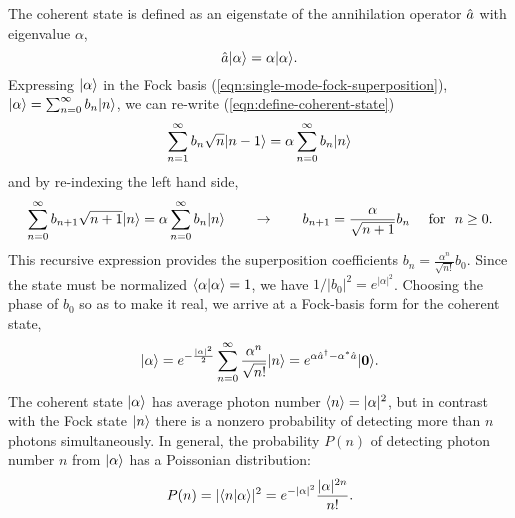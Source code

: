 The coherent state is defined as an eigenstate of the annihilation operator $\hat{a}$ with eigenvalue $\alpha$,
\begin{equation}
    \hat{a}\mbox{$ | \alpha \rangle $} = \alpha \mbox{$ | \alpha \rangle $}.
    \label{eqn:define-coherent-state}
\end{equation}
Expressing $\mbox{$ | \alpha \rangle $}$ in the Fock basis (\ref{eqn:single-mode-fock-superposition}), $\mbox{$ | \alpha \rangle $} = \sum_{n=0}^\infty b_n \mbox{$ | n \rangle $}$, we can re-write (\ref{eqn:define-coherent-state})
\begin{equation}
    \sum_{n=1}^{\infty} b_n \sqrt{n} \mbox{$ | n-1 \rangle $} = \alpha \sum_{n=0}^\infty b_n \mbox{$ | n \rangle $} 
\end{equation}
and by re-indexing the left hand side,
\begin{gather}
    \sum_{n=0}^{\infty} b_{n+1} \sqrt{n+1} \mbox{$ | n \rangle $} = \alpha \sum_{n=0}^\infty b_n \mbox{$ | n \rangle $} \qquad 
    \rightarrow \qquad b_{n+1} = \frac{\alpha}{\sqrt{n+1}} b_n~\quad \text{for}~~ n\ge0.
\end{gather}
This recursive expression provides the superposition coefficients $b_n = \frac{\alpha^n}{\sqrt{n!}}b_0$. Since the state must be normalized $\langle \alpha | \alpha \rangle=1$, we have $1/|b_0|^2 = e^{|\alpha|^2}$.  Choosing the phase of $b_0$ so as to make it real, we arrive at a Fock-basis form for the coherent state,
\begin{equation}
    \mbox{$ | \alpha \rangle $} = e^{-\frac{|\alpha|^2}{2}} \sum_{n=0}^{\infty} \frac{\alpha^n}{\sqrt{n!}} \mbox{$ | n \rangle $} =
    e^{\alpha \hat{a}^{\dagger} - \alpha^* \hat{a}} \mbox{$ | \mathbf{0} \rangle $}.
    \label{eqn:coherent-state-fock-basis}
\end{equation}
The coherent state $\mbox{$ | \alpha \rangle $}$ has average photon number $\langle n \rangle = |\alpha|^2$, but in contrast with the Fock state $\mbox{$ | n \rangle $}$ there is a nonzero probability of detecting more than $n$ photons simultaneously.
In general, the probability $P(n)$ of detecting photon number $n$ from $\mbox{$ | \alpha \rangle $}$ has a Poissonian distribution:
\begin{equation}
    P(n) = |\langle n | \alpha \rangle|^2 = e^{-|\alpha|^2} \frac{|\alpha|^{2n}}{n!}.
\end{equation}

